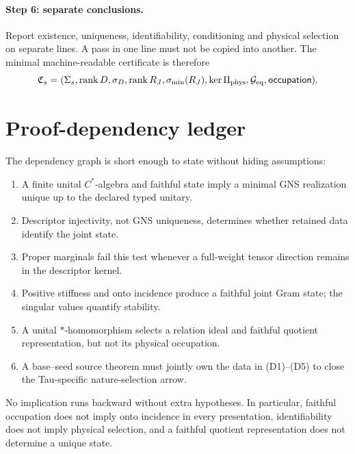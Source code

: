 \documentclass[11pt]{article}
\begin{document}
\paragraph{Step 6: separate conclusions.}
Report existence, uniqueness, identifiability, conditioning and physical
selection on separate lines.  A pass in one line must not be copied into
another.  The minimal machine-readable certificate is therefore
\begin{equation}
 \mathfrak C_s=
 (\Sigma_s,\operatorname{rank}D,\sigma_D,
  \operatorname{rank}R_J,\sigma_{\min}(R_J),
  \ker\Pi_{\rm phys},\mathcal G_{\rm eq},\mathsf{occupation}).
 \label{eq:finite-certificate}
\end{equation}

\section{Proof-dependency ledger}

The dependency graph is short enough to state without hiding assumptions:
\begin{enumerate}[label=(D\arabic*)]
 \item A finite unital \(C^*\)-algebra and faithful state imply a minimal GNS
 realization unique up to the declared typed unitary.
 \item Descriptor injectivity, not GNS uniqueness, determines whether retained
 data identify the joint state.
 \item Proper marginals fail this test whenever a full-weight tensor direction
 remains in the descriptor kernel.
 \item Positive stiffness and onto incidence produce a faithful joint Gram
 state; the singular values quantify stability.
 \item A unital \(*\)-homomorphism selects a relation ideal and faithful
 quotient representation, but not its physical occupation.
 \item A base--seed source theorem must jointly own the data in (D1)--(D5) to
 close the Tau-specific nature-selection arrow.
\end{enumerate}

No implication runs backward without extra hypotheses.  In particular,
faithful occupation does not imply onto incidence in every presentation,
identifiability does not imply physical selection, and a faithful quotient
representation does not determine a unique state.



\end{document}
